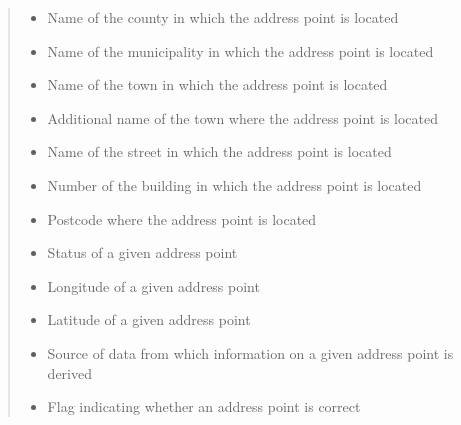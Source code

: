 \documentclass[letterpaper,10pt,english]{sphinxmanual}
\begin{document}
\begin{fulllineitems}
\begin{fulllineitems}
\begin{quote}
\begin{description}
\begin{itemize}
\item {} 
\sphinxAtStartPar
{} \textendash{} Name of the county in which the address point is located

\item {} 
\sphinxAtStartPar
{} \textendash{} Name of the municipality in which the address point is located

\item {} 
\sphinxAtStartPar
{} \textendash{} Name of the town in which the address point is located

\item {} 
\sphinxAtStartPar
{} \textendash{} Additional name of the town where the address point is located

\item {} 
\sphinxAtStartPar
{} \textendash{} Name of the street in which the address point is located

\item {} 
\sphinxAtStartPar
{} \textendash{} Number of the building in which the address point is located

\item {} 
\sphinxAtStartPar
{} \textendash{} Postcode where the address point is located

\item {} 
\sphinxAtStartPar
{} \textendash{} Status of a given address point

\item {} 
\sphinxAtStartPar
{} \textendash{} Longitude of a given address point

\item {} 
\sphinxAtStartPar
{} \textendash{} Latitude of a given address point

\item {} 
\sphinxAtStartPar
{} \textendash{} Source of data from which information on a given address point is derived

\item {} 
\sphinxAtStartPar
{} \textendash{} Flag indicating whether an address point is correct


\end{itemize}
\end{description}
\end{quote}
\end{fulllineitems}
\end{fulllineitems}
\end{document}
